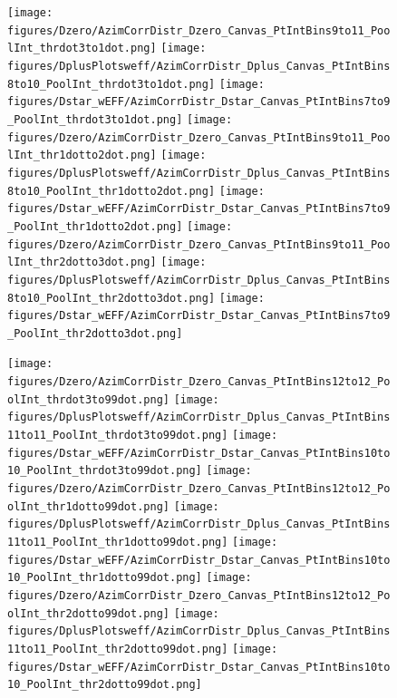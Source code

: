 \begin{figure}[!htbp]
\centering
{\texttt{[image: figures/Dzero/AzimCorrDistr\_Dzero\_Canvas\_PtIntBins9to11\_PoolInt\_thrdot3to1dot.png]}}
{\texttt{[image: figures/DplusPlotsweff/AzimCorrDistr\_Dplus\_Canvas\_PtIntBins8to10\_PoolInt\_thrdot3to1dot.png]}}
{\texttt{[image: figures/Dstar\_wEFF/AzimCorrDistr\_Dstar\_Canvas\_PtIntBins7to9\_PoolInt\_thrdot3to1dot.png]}}
{\texttt{[image: figures/Dzero/AzimCorrDistr\_Dzero\_Canvas\_PtIntBins9to11\_PoolInt\_thr1dotto2dot.png]}}
{\texttt{[image: figures/DplusPlotsweff/AzimCorrDistr\_Dplus\_Canvas\_PtIntBins8to10\_PoolInt\_thr1dotto2dot.png]}}
{\texttt{[image: figures/Dstar\_wEFF/AzimCorrDistr\_Dstar\_Canvas\_PtIntBins7to9\_PoolInt\_thr1dotto2dot.png]}}
{\texttt{[image: figures/Dzero/AzimCorrDistr\_Dzero\_Canvas\_PtIntBins9to11\_PoolInt\_thr2dotto3dot.png]}}
{\texttt{[image: figures/DplusPlotsweff/AzimCorrDistr\_Dplus\_Canvas\_PtIntBins8to10\_PoolInt\_thr2dotto3dot.png]}}
{\texttt{[image: figures/Dstar\_wEFF/AzimCorrDistr\_Dstar\_Canvas\_PtIntBins7to9\_PoolInt\_thr2dotto3dot.png]}}

{\texttt{[image: figures/Dzero/AzimCorrDistr\_Dzero\_Canvas\_PtIntBins12to12\_PoolInt\_thrdot3to99dot.png]}}
{\texttt{[image: figures/DplusPlotsweff/AzimCorrDistr\_Dplus\_Canvas\_PtIntBins11to11\_PoolInt\_thrdot3to99dot.png]}}
{\texttt{[image: figures/Dstar\_wEFF/AzimCorrDistr\_Dstar\_Canvas\_PtIntBins10to10\_PoolInt\_thrdot3to99dot.png]}}
{\texttt{[image: figures/Dzero/AzimCorrDistr\_Dzero\_Canvas\_PtIntBins12to12\_PoolInt\_thr1dotto99dot.png]}}
{\texttt{[image: figures/DplusPlotsweff/AzimCorrDistr\_Dplus\_Canvas\_PtIntBins11to11\_PoolInt\_thr1dotto99dot.png]}}
{\texttt{[image: figures/Dstar\_wEFF/AzimCorrDistr\_Dstar\_Canvas\_PtIntBins10to10\_PoolInt\_thr1dotto99dot.png]}}
{\texttt{[image: figures/Dzero/AzimCorrDistr\_Dzero\_Canvas\_PtIntBins12to12\_PoolInt\_thr2dotto99dot.png]}}
{\texttt{[image: figures/DplusPlotsweff/AzimCorrDistr\_Dplus\_Canvas\_PtIntBins11to11\_PoolInt\_thr2dotto99dot.png]}}
{\texttt{[image: figures/Dstar\_wEFF/AzimCorrDistr\_Dstar\_Canvas\_PtIntBins10to10\_PoolInt\_thr2dotto99dot.png]}}
\end{figure}
